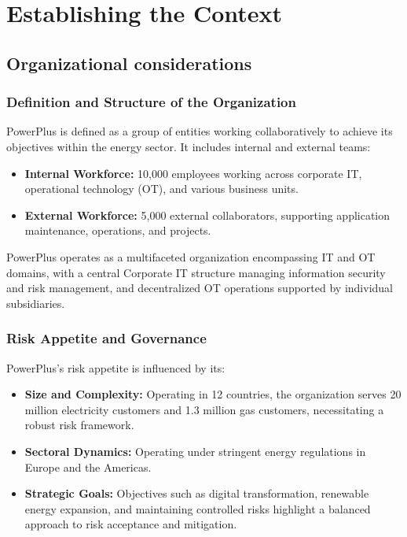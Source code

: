 \chapter{Establishing the Context}

\section{Organizational considerations}

\subsection{Definition and Structure of the Organization}
PowerPlus is defined as a group of entities working collaboratively to achieve its objectives within the energy sector. It includes internal and external teams:

\begin{itemize}
    \item \textbf{Internal Workforce:} 10,000 employees working across corporate IT, operational technology (OT), and various business units.
    \item \textbf{External Workforce:} 5,000 external collaborators, supporting application maintenance, operations, and projects.
\end{itemize}

PowerPlus operates as a multifaceted organization encompassing IT and OT domains, with a central Corporate IT structure managing information security and risk management, and decentralized OT operations supported by individual subsidiaries.

\subsection{Risk Appetite and Governance}
PowerPlus's risk appetite is influenced by its:

\begin{itemize}
    \item \textbf{Size and Complexity:} Operating in 12 countries, the organization serves 20 million electricity customers and 1.3 million gas customers, necessitating a robust risk framework.
    \item \textbf{Sectoral Dynamics:} Operating under stringent energy regulations in Europe and the Americas.
    \item \textbf{Strategic Goals:} Objectives such as digital transformation, renewable energy expansion, and maintaining controlled risks highlight a balanced approach to risk acceptance and mitigation.
\end{itemize}


